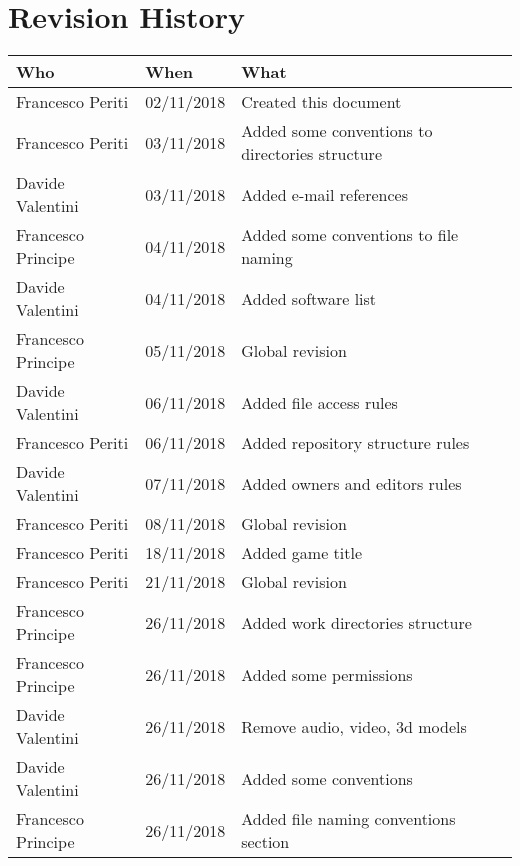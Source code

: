 \section*{Revision History}
\begin{table}[H]
\centering
  \begin{tabularx}{\textwidth}{|l|l|X|}
\hline
\cellcolor{lightgray}\textbf{Who} & \cellcolor{lightgray}\textbf{When} & \cellcolor{lightgray}\textbf{What} \\ \hline
Francesco Periti & 02/11/2018 & Created this document \\ \hline
Francesco Periti & 03/11/2018 & Added some conventions to directories structure \\ \hline
Davide Valentini & 03/11/2018 & Added e-mail references \\ \hline
Francesco Principe & 04/11/2018 & Added some conventions to file naming \\ \hline
Davide Valentini & 04/11/2018 & Added software list \\ \hline
Francesco Principe & 05/11/2018 & Global revision \\ \hline
Davide Valentini & 06/11/2018 & Added file access rules \\ \hline
Francesco Periti & 06/11/2018 & Added repository structure rules \\ \hline
Davide Valentini & 07/11/2018 & Added owners and editors rules \\ \hline
Francesco Periti & 08/11/2018 & Global revision \\ \hline
Francesco Periti & 18/11/2018 & Added game title \\ \hline
Francesco Periti & 21/11/2018 & Global revision \\ \hline
Francesco Principe & 26/11/2018 & Added work directories structure \\ \hline
Francesco Principe & 26/11/2018 & Added some permissions \\ \hline
Davide Valentini & 26/11/2018 & Remove audio, video, 3d models \\ \hline
Davide Valentini & 26/11/2018 & Added some conventions \\ \hline
Francesco Principe & 26/11/2018 & Added file naming conventions section\\ \hline


\end{tabularx}
\end{table}
